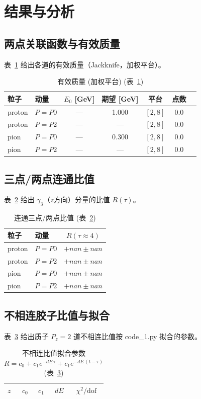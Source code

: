 \documentclass[11pt,a4paper]{article}
\begin{document}
\section{结果与分析}
\subsection{两点关联函数与有效质量}
表~\ref{tab:meff} 给出各道的有效质量（Jackknife，加权平台）。
\begin{table}[h]
\centering
\caption{有效质量 (加权平台) (表~\ref{tab:meff})}
\label{tab:meff}
\begin{tabular}{llccccl}
\toprule
粒子 & 动量 & $E_0$ [GeV] & 期望 [GeV] & 平台 & 点数 \\
\midrule
    proton & $P={P0}$ & — & 1.000 & $[2,8]$ & 0.0 \\
    proton & $P={P2}$ & — & — & $[2,8]$ & 0.0 \\
    pion & $P={P0}$ & — & 0.300 & $[2,8]$ & 0.0 \\
    pion & $P={P2}$ & — & — & $[2,8]$ & 0.0 \\
\bottomrule
\end{tabular}
\end{table}

\subsection{三点/两点连通比值}
表~\ref{tab:ratio} 给出 $\gamma_3$（$z$方向）分量的比值 $R(\tau)$。
\begin{table}[h]
\centering
\caption{连通三点/两点比值 (表~\ref{tab:ratio})}
\label{tab:ratio}
\begin{tabular}{llc}
\toprule
粒子 & 动量 & $R(\tau{\approx}4)$ \\
\midrule
    proton & $P={P0}$ & $+nan \pm nan$ \\
    proton & $P={P2}$ & $+nan \pm nan$ \\
    pion & $P={P0}$ & $+nan \pm nan$ \\
    pion & $P={P2}$ & $+nan \pm nan$ \\
\bottomrule
\end{tabular}
\end{table}

\subsection{不相连胶子比值与拟合}
表~\ref{tab:disc} 给出质子 $P_z=2$ 道不相连比值按 code\_1.py 拟合的参数。
\begin{table}[h]
\centering
\caption{不相连比值拟合参数 $R=c_0+c_1e^{-dE\,\tau}+c_1e^{-dE\,(t-\tau)}$ (表~\ref{tab:disc})}
\label{tab:disc}
\begin{tabular}{lcccc}
\toprule
$z$ & $c_0$ & $c_1$ & $dE$ & $\chi^2/\mathrm{dof}$ \\
\midrule

\bottomrule
\end{tabular}
\end{table}
\end{document}
